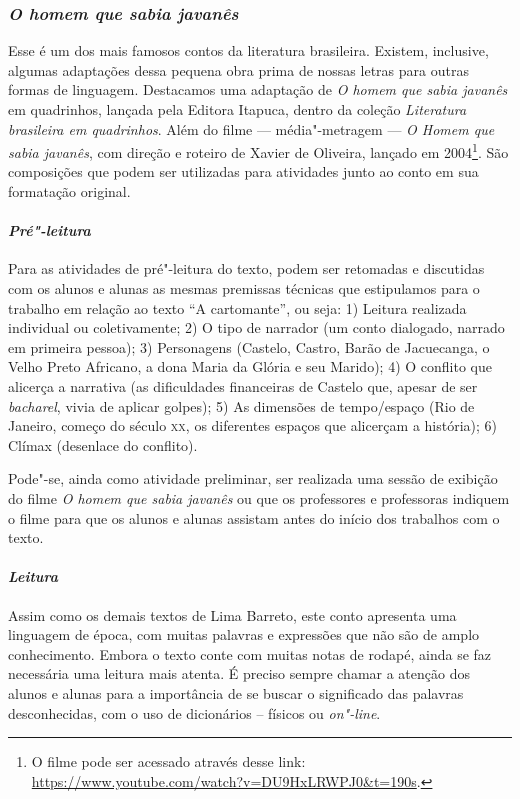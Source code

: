 \documentclass[11pt]{extarticle}
\begin{document}
\subsubsection{\textit{O homem que sabia javanês}}

Esse é um dos mais famosos contos da literatura brasileira. Existem,
inclusive, algumas adaptações dessa pequena obra prima de nossas letras
para outras formas de linguagem. Destacamos uma adaptação de
\textit{O homem que sabia javanês} em quadrinhos, lançada pela
Editora Itapuca, dentro da coleção \emph{Literatura brasileira em
quadrinhos}. Além do filme --- média"-metragem --- \emph{O Homem que sabia
javanês}, com direção e roteiro de Xavier de Oliveira, lançado em
2004\footnote{O filme pode ser acessado através desse link:
  \url{https://www.youtube.com/watch?v=DU9HxLRWPJ0\&t=190s}.}. São
composições que podem ser utilizadas para atividades junto ao conto em
sua formatação original.

\paragraph{\textit{Pré"-leitura}}

Para as atividades de pré"-leitura do texto, podem ser retomadas e
discutidas com os alunos e alunas as mesmas premissas técnicas que
estipulamos para o trabalho em relação ao texto ``A
cartomante'', ou seja: 1) Leitura realizada individual ou coletivamente;
2) O tipo de narrador (um conto dialogado, narrado em primeira pessoa);
3) Personagens (Castelo, Castro, Barão de Jacuecanga, o Velho Preto
Africano, a dona Maria da Glória e seu Marido); 4) O conflito que
alicerça a narrativa (as dificuldades financeiras de Castelo que, apesar
de ser \emph{bacharel}, vivia de aplicar golpes); 5) As dimensões de
tempo/espaço (Rio de Janeiro, começo do século \textsc{xx}, os diferentes espaços
que alicerçam a história); 6) Clímax (desenlace do conflito).

Pode"-se, ainda como atividade preliminar, ser realizada uma sessão de
exibição do filme \emph{O homem que sabia javanês} ou que os professores e
professoras indiquem o filme para que os alunos e alunas assistam antes
do início dos trabalhos com o texto.

\paragraph{\textit{Leitura}}

Assim como os demais textos de Lima Barreto, este conto apresenta uma
linguagem de época, com muitas palavras e expressões que não são de
amplo conhecimento. Embora o texto conte com muitas notas de rodapé,
ainda se faz necessária uma leitura mais atenta. É preciso sempre chamar
a atenção dos alunos e alunas para a importância de se buscar o
significado das palavras desconhecidas, com o uso de dicionários --
físicos ou ­\emph{on"-line}.
\end{document}
